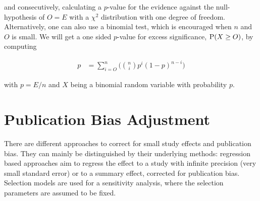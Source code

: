 \documentclass[11pt,a4paper,twoside]{book}\usepackage[]{graphicx}\usepackage[]{color}
\begin{document}
and consecutively, calculating a $p$\hspace{0.4mm}-value for the evidence against the null-hypothesis of $O = E$ with a $\chi^2$ distribution with one degree of freedom. Alternatively, one can also use a binomial test, which is encouraged when $n$ and $O$ is small. We will get a one sided $p$\hspace{0.4mm}-value for excess significance, $\P(X \geq O)$, by computing

\begin{align}
p &= \sum_{i = O}^n\Big({n \choose i} p^i (1-p)^{n - i}\Big)
\end{align}

with $p = E/n$ and $X$ being a binomial random variable with probability $p$. 











\section{Publication Bias Adjustment}
There are different approaches to correct for small study effects and publication bias. They can mainly be distinguished by their underlying methods: regression based approaches aim to regress the effect to a study with infinite precision (\ie very small standard error) or to a summary effect, corrected for publication bias. Selection models are used for a sensitivity analysis, where the selection parameters are assumed to be fixed. 
\end{document}
